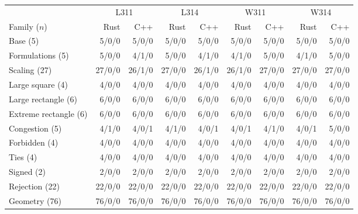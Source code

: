 \begin{tabular}{lrrrrrrrr}
\toprule
& \multicolumn{2}{c}{L311} & \multicolumn{2}{c}{L314} & \multicolumn{2}{c}{W311} & \multicolumn{2}{c}{W314} \\
Family ($n$) & Rust & C++ & Rust & C++ & Rust & C++ & Rust & C++ \\
\midrule
Base (5) & 5/0/0 & 5/0/0 & 5/0/0 & 5/0/0 & 5/0/0 & 5/0/0 & 5/0/0 & 5/0/0 \\
Formulations (5) & 5/0/0 & 4/1/0 & 5/0/0 & 4/1/0 & 4/1/0 & 5/0/0 & 4/1/0 & 5/0/0 \\
Scaling (27) & 27/0/0 & 26/1/0 & 27/0/0 & 26/1/0 & 26/1/0 & 27/0/0 & 27/0/0 & 27/0/0 \\
Large square (4) & 4/0/0 & 4/0/0 & 4/0/0 & 4/0/0 & 4/0/0 & 4/0/0 & 4/0/0 & 4/0/0 \\
Large rectangle (6) & 6/0/0 & 6/0/0 & 6/0/0 & 6/0/0 & 6/0/0 & 6/0/0 & 6/0/0 & 6/0/0 \\
Extreme rectangle (6) & 6/0/0 & 6/0/0 & 6/0/0 & 6/0/0 & 6/0/0 & 6/0/0 & 6/0/0 & 6/0/0 \\
Congestion (5) & 4/1/0 & 4/0/1 & 4/1/0 & 4/0/1 & 4/0/1 & 4/1/0 & 4/0/1 & 5/0/0 \\
Forbidden (4) & 4/0/0 & 4/0/0 & 4/0/0 & 4/0/0 & 4/0/0 & 4/0/0 & 4/0/0 & 4/0/0 \\
Ties (4) & 4/0/0 & 4/0/0 & 4/0/0 & 4/0/0 & 4/0/0 & 4/0/0 & 4/0/0 & 4/0/0 \\
Signed (2) & 2/0/0 & 2/0/0 & 2/0/0 & 2/0/0 & 2/0/0 & 2/0/0 & 2/0/0 & 2/0/0 \\
Rejection (22) & 22/0/0 & 22/0/0 & 22/0/0 & 22/0/0 & 22/0/0 & 22/0/0 & 22/0/0 & 22/0/0 \\
Geometry (76) & 76/0/0 & 76/0/0 & 76/0/0 & 76/0/0 & 76/0/0 & 76/0/0 & 76/0/0 & 76/0/0 \\
\bottomrule
\end{tabular}
